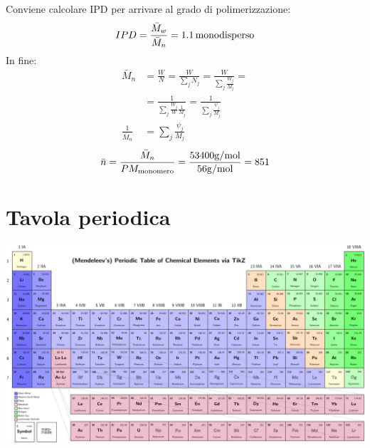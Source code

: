 Conviene calcolare \ac{IPD} per arrivare al grado di polimerizzazione:
\begin{equation}
IPD = \frac{\bar{M}_w}{\bar{M}_n} = 1.1\,\textup{monodisperso}
\end{equation}
In fine:
\begin{equation}
\begin{split}
\bar{M}_n &= \frac{W}{N} = \frac{W}{\sum_j{N_j}} = \frac{W}{\sum_j{\frac{W_j}{M_j}}} =\\
&= \frac{1}{\sum_j{\frac{W_j}{W}\frac{1}{M_j}}} = \frac{1}{\sum_j{\frac{\psi_j}{M_j}}}\\
\frac{1}{\bar{M}_n} &= \sum_j{\frac{\psi_j}{M_j}}
\end{split}
\end{equation}
\begin{equation}
\bar{n} = \frac{\bar{M}_n}{PM_{\textup{monomero}}} = \frac{53400\unit{\g/\mol}}{56\unit{\g/\mol}} = 851
\end{equation}




\chapter{Tavola periodica}\label{chp:Tavolaperiodica}
\newpage
\includegraphics[scale = 1, angle = 90]{gfx/Periodic_table2017}